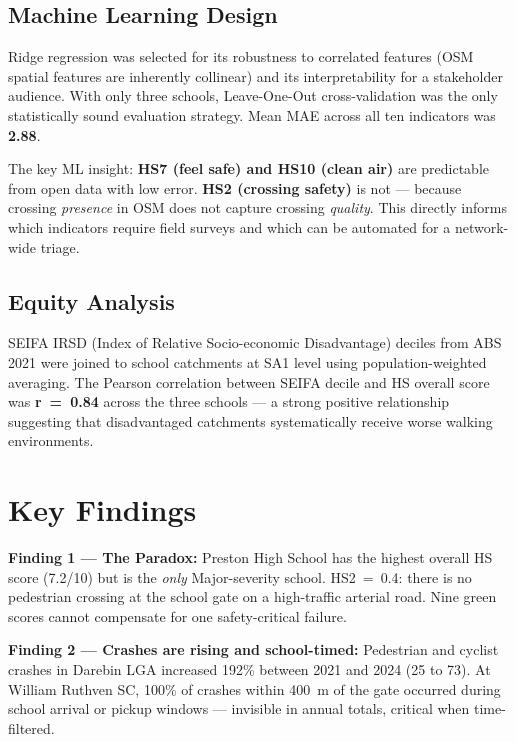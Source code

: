 \documentclass[11pt,a4paper]{article}
\begin{document}
\vspace{4pt}

\subsection{Machine Learning Design}

Ridge regression was selected for its robustness to correlated features (OSM spatial features are inherently collinear) and its interpretability for a stakeholder audience. With only three schools, Leave-One-Out cross-validation was the only statistically sound evaluation strategy. Mean MAE across all ten indicators was \textbf{2.88}.

The key ML insight: \textbf{HS7 (feel safe) and HS10 (clean air)} are predictable from open data with low error. \textbf{HS2 (crossing safety)} is not --- because crossing \emph{presence} in OSM does not capture crossing \emph{quality}. This directly informs which indicators require field surveys and which can be automated for a network-wide triage.

\subsection{Equity Analysis}

SEIFA IRSD (Index of Relative Socio-economic Disadvantage) deciles from ABS 2021 were joined to school catchments at SA1 level using population-weighted averaging. The Pearson correlation between SEIFA decile and HS overall score was \textbf{r~=~0.84} across the three schools --- a strong positive relationship suggesting that disadvantaged catchments systematically receive worse walking environments.

\section{Key Findings}

\begin{findingbox}
\textbf{Finding 1 --- The Paradox:} Preston High School has the highest overall HS score (7.2/10) but is the \emph{only} Major-severity school. HS2~=~0.4: there is no pedestrian crossing at the school gate on a high-traffic arterial road. Nine green scores cannot compensate for one safety-critical failure.
\end{findingbox}

\begin{insightbox}
\textbf{Finding 2 --- Crashes are rising and school-timed:} Pedestrian and cyclist crashes in Darebin LGA increased 192\% between 2021 and 2024 (25 to 73). At William Ruthven SC, 100\% of crashes within 400~m of the gate occurred during school arrival or pickup windows --- invisible in annual totals, critical when time-filtered.
\end{insightbox}
\end{document}
